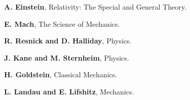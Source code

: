 \documentclass[10pt]{article}
\begin{document}
\vspace{+0.75em}

\par \textbf{A. Einstein}, Relativity: The Special and General Theory.
\bigskip
\par \textbf{E. Mach}, The Science of Mechanics.
\bigskip
\par \textbf{R. Resnick and D. Halliday}, Physics.
\bigskip
\par \textbf{J. Kane and M. Sternheim}, Physics.
\bigskip
\par \textbf{H. Goldstein}, Classical Mechanics.
\bigskip
\par \textbf{L. Landau and E. Lifshitz}, Mechanics.
\end{document}
